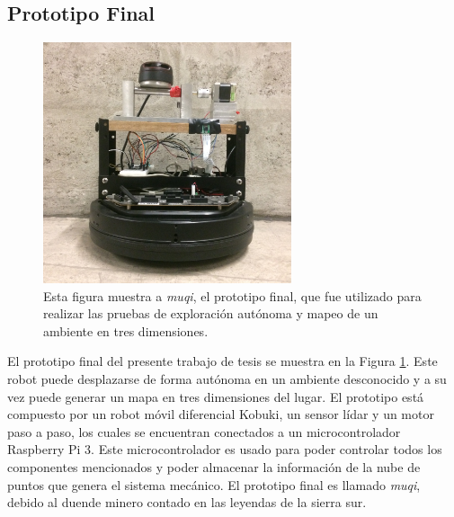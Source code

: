 \subsection{Prototipo Final}
\begin{figure}%
	\centering \footnotesize
	\includegraphics[width=0.65\textwidth]{images/ProtFinal.JPG}
	\captionsetup{font=footnotesize}
	\caption{Esta figura muestra a \textit{muqi}, el prototipo final, que fue utilizado para 
	realizar las pruebas de exploración autónoma y mapeo de un ambiente en tres dimensiones. }
	\label{fig:ProtoFinal}
\end{figure}
El prototipo final del presente trabajo de tesis se muestra en la Figura 
\ref{fig:ProtoFinal}. Este robot puede desplazarse de forma autónoma en un ambiente desconocido 
y a su vez puede generar un mapa en tres dimensiones del lugar. El prototipo está compuesto por un robot
móvil diferencial Kobuki, un sensor lídar y un motor paso a paso, los cuales se encuentran conectados
a un microcontrolador Raspberry Pi 3. Este microcontrolador es usado para poder controlar 
todos los componentes mencionados y poder almacenar la información de la nube de puntos que genera 
el sistema mecánico. El prototipo final es llamado \textit{muqi}, debido al duende minero 
contado en las leyendas de la sierra sur.



